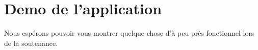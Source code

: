  \part{Demo de l'application} %
 \label{prt:demo_ _de_ _l_'_application_}
 
 Nous espérons pouvoir vous montrer quelque chose d'à peu près fonctionnel lors de la soutenance.
 
